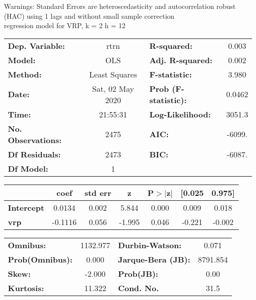 Warnings: \newline
 [1] Standard Errors are heteroscedasticity and autocorrelation robust (HAC) using 1 lags and without small sample correction\\ 

regression model for VRP, k = 2 h = 12\begin{center}
\begin{tabular}{lclc}
\toprule
\textbf{Dep. Variable:}    &       rtrn       & \textbf{  R-squared:         } &     0.003   \\
\textbf{Model:}            &       OLS        & \textbf{  Adj. R-squared:    } &     0.002   \\
\textbf{Method:}           &  Least Squares   & \textbf{  F-statistic:       } &     3.980   \\
\textbf{Date:}             & Sat, 02 May 2020 & \textbf{  Prob (F-statistic):} &   0.0462    \\
\textbf{Time:}             &     21:55:31     & \textbf{  Log-Likelihood:    } &    3051.3   \\
\textbf{No. Observations:} &        2475      & \textbf{  AIC:               } &    -6099.   \\
\textbf{Df Residuals:}     &        2473      & \textbf{  BIC:               } &    -6087.   \\
\textbf{Df Model:}         &           1      & \textbf{                     } &             \\
\bottomrule
\end{tabular}
\begin{tabular}{lcccccc}
                   & \textbf{coef} & \textbf{std err} & \textbf{z} & \textbf{P$> |$z$|$} & \textbf{[0.025} & \textbf{0.975]}  \\
\midrule
\textbf{Intercept} &       0.0134  &        0.002     &     5.844  &         0.000        &        0.009    &        0.018     \\
\textbf{vrp}       &      -0.1116  &        0.056     &    -1.995  &         0.046        &       -0.221    &       -0.002     \\
\bottomrule
\end{tabular}
\begin{tabular}{lclc}
\textbf{Omnibus:}       & 1132.977 & \textbf{  Durbin-Watson:     } &    0.071  \\
\textbf{Prob(Omnibus):} &   0.000  & \textbf{  Jarque-Bera (JB):  } & 8791.854  \\
\textbf{Skew:}          &  -2.000  & \textbf{  Prob(JB):          } &     0.00  \\
\textbf{Kurtosis:}      &  11.322  & \textbf{  Cond. No.          } &     31.5  \\
\bottomrule
\end{tabular}
\end{center}

